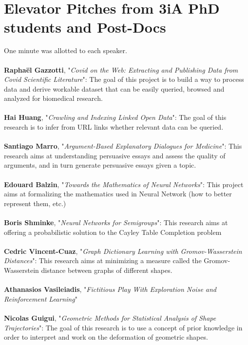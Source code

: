\documentclass[a4paper]{article}
\begin{document}
\section{Elevator Pitches from 3iA PhD students and Post-Docs}
One minute was allotted to each speaker.
\\\\
\textbf{Raphaël Gazzotti}, "\textit{Covid on the Web: Extracting and Publishing Data from Covid Scientific Literature}": The goal of this project is to build a way to process data and derive workable dataset that can be easily queried, browsed and analyzed for biomedical research.
\\\\
\textbf{Hai Huang}, "\textit{Crawling and Indexing Linked Open Data}": The goal of this research is to infer from URL links whether relevant data can be queried.
\\\\
\textbf{Santiago Marro}, "\textit{Argument-Based Explanatory Dialogues for Medicine}": This research aims at understanding persuasive essays and assess the quality of arguments, and in turn generate persuasive essays given a topic. 
\\\\
\textbf{Edouard Balzin}, "\textit{Towards the Mathematics of Neural Networks}": This project aims at formalizing the mathematics used in Neural Network (how to better represent them, etc.)
\\\\
\textbf{Boris Shminke}, "\textit{Neural Networks for Semigroups}": This research aims at offering a probabilistic solution to the Cayley Table Completion problem
\\\\
\textbf{Cedric Vincent-Cuaz}, "\textit{Graph Dictionary Learning with Gromov-Wasserstein Distances}": This research aims at minimizing a measure called the Gromov-Wasserstein distance between graphs of different shapes.
\\\\
\textbf{Athanasios Vasileiadis}, "\textit{Fictitious Play With Exploration Noise and Reinforcement Learning}"
\\\\
\textbf{Nicolas Guigui}, "\textit{Geometric Methods for Statistical Analysis of Shape Trajectories}": The goal of this research is to use a concept of prior knowledge in order to interpret and work on the deformation of geometric shapes.
\\\\
\end{document}
